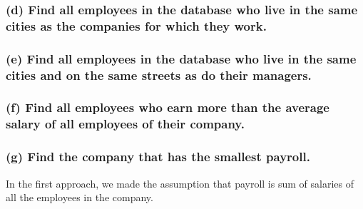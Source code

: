 \documentclass[12pt]{article}
\begin{document}

\subsubsection*{(d) Find all employees in the database who live in the same cities as the companies for which they work.}


\subsubsection*{(e) Find all employees in the database who live in the same cities and on the same streets as do their managers.}


\vspace{1.2cm}
\subsubsection*{(f) Find all employees who earn more than the average salary of all employees of their company.}


\vspace{1.2cm}
\subsubsection*{(g) Find the company that has the smallest payroll.}

In the first approach, we made the assumption that payroll is sum of salaries of all the employees in the company.
\vspace{5mm} \\
\vspace{5mm} \\
\end{document}
